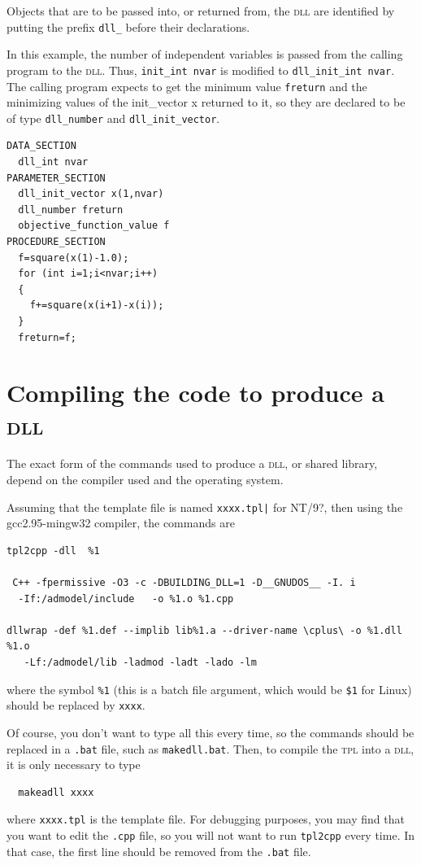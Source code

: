 Objects that are to be passed into, or returned from, the
\textsc{dll} are identified by putting the prefix \texttt{dll\_}
before their declarations.

In this example, the number of independent variables
is passed from the calling program to the \textsc{dll}.
Thus, \texttt{init\_int nvar} is modified to 
\texttt{dll\_init\_int nvar}. The calling program
expects to get the minimum value \texttt{freturn}
and the minimizing values
of the {init\_vector x} returned to it, so they are declared to be
of type \texttt{dll\_number} and \texttt{dll\_init\_vector}.
\begin{lstlisting}
DATA_SECTION
  dll_int nvar
PARAMETER_SECTION
  dll_init_vector x(1,nvar)
  dll_number freturn
  objective_function_value f
PROCEDURE_SECTION
  f=square(x(1)-1.0);
  for (int i=1;i<nvar;i++)
  {
    f+=square(x(i+1)-x(i));
  }
  freturn=f;
\end{lstlisting}


\section{Compiling the code to produce a \textsc{dll}}

The exact form of the commands used to produce a \textsc{dll}, or shared library,
depend on the compiler used and the operating system.

Assuming that the template file is named \texttt{xxxx.tpl|}
for NT/9?, then using the gcc2.95-mingw32 compiler, the 
commands are 
\begin{lstlisting}
tpl2cpp -dll  %1

 C++ -fpermissive -O3 -c -DBUILDING_DLL=1 -D__GNUDOS__ -I. i
  -If:/admodel/include   -o %1.o %1.cpp

dllwrap -def %1.def --implib lib%1.a --driver-name \cplus\ -o %1.dll  %1.o 
   -Lf:/admodel/lib -ladmod -ladt -lado -lm 
\end{lstlisting}
where the symbol \texttt{\%1} (this is a batch file argument, which would
be \texttt{\$1} for Linux) should be replaced by \texttt{xxxx}.

Of course, you don't want to type all this every time, so the commands
should be replaced in a \texttt{.bat} file,
such as \texttt{makedll.bat}.
Then, to compile the \textsc{tpl} into a \textsc{dll}, it is only necessary to type
\begin{lstlisting}
  makeadll xxxx
\end{lstlisting}
where \texttt{xxxx.tpl} is the template file.
For debugging purposes, you may find that you want to edit the
\texttt{.cpp} file, so you will not want to run \texttt{tpl2cpp}
every time. In that case, the first line should be removed from
the \texttt{.bat} file.

